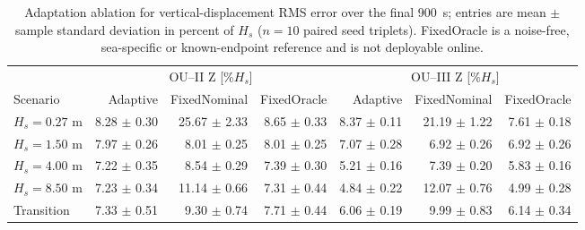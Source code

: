 \begin{table}[t]
  \centering
  \caption{Adaptation ablation for vertical-displacement RMS error over the final \SI{900}{s}; entries are mean $\pm$ sample standard deviation in percent of $H_s$ ($n=10$ paired seed triplets). FixedOracle is a noise-free, sea-specific or known-endpoint reference and is not deployable online.}
  \label{tab:ou_mc_adaptation}
  \footnotesize
  \setlength{\tabcolsep}{3.6pt}
  \begin{tabular}{@{}lrrrrrr@{}}
    \toprule
    & \multicolumn{3}{c}{OU--II Z [\%$H_s$]} & \multicolumn{3}{c}{OU--III Z [\%$H_s$]} \\
    \cmidrule(lr){2-4}\cmidrule(lr){5-7}
    Scenario & Adaptive & FixedNominal & FixedOracle & Adaptive & FixedNominal & FixedOracle \\
    \midrule
    $H_s=0.27$ m & 8.28 $\pm$ 0.30 & 25.67 $\pm$ 2.33 & 8.65 $\pm$ 0.33 & 8.37 $\pm$ 0.11 & 21.19 $\pm$ 1.22 & 7.61 $\pm$ 0.18 \\
    $H_s=1.50$ m & 7.97 $\pm$ 0.26 & 8.01 $\pm$ 0.25 & 8.01 $\pm$ 0.25 & 7.07 $\pm$ 0.28 & 6.92 $\pm$ 0.26 & 6.92 $\pm$ 0.26 \\
    $H_s=4.00$ m & 7.22 $\pm$ 0.35 & 8.54 $\pm$ 0.29 & 7.39 $\pm$ 0.30 & 5.21 $\pm$ 0.16 & 7.39 $\pm$ 0.20 & 5.83 $\pm$ 0.16 \\
    $H_s=8.50$ m & 7.23 $\pm$ 0.34 & 11.14 $\pm$ 0.66 & 7.31 $\pm$ 0.44 & 4.84 $\pm$ 0.22 & 12.07 $\pm$ 0.76 & 4.99 $\pm$ 0.28 \\
    Transition & 7.33 $\pm$ 0.51 & 9.30 $\pm$ 0.74 & 7.71 $\pm$ 0.44 & 6.06 $\pm$ 0.19 & 9.99 $\pm$ 0.83 & 6.14 $\pm$ 0.34 \\
    \bottomrule
  \end{tabular}
\end{table}

